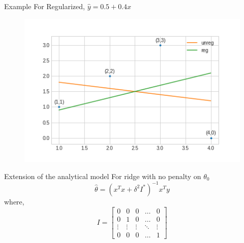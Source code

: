 \documentclass{beamer}
\begin{document}
\begin{frame}{Example}
\vspace{0.4cm}
For Regularized, $\hat{y} = 0.5+0.4x$
\vspace{-0.6cm}
\begin{figure}
\includegraphics[width=\linewidth]{ridge/ques_3.png}
\end{figure}
\end{frame}

\begin{frame}{Extension of the analytical model}
For ridge with no penalty on $\theta_0$
$$
\hat{\theta} = \left(x^Tx+\delta^2I^*\right)^{-1}x^Ty
$$
where, $$I = \begin{bmatrix}
    0 & 0 & 0 & \dots  & 0 \\
    0 & 1& 0 & \dots  & 0\\
    \vdots & \vdots & \vdots & \ddots & \vdots \\
    0 & 0 & 0 & \dots  & 1
\end{bmatrix}$$
\end{frame}
\end{document}
